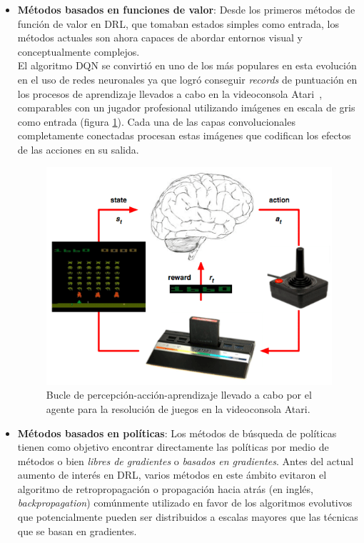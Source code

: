 \begin{itemize}
    \item \textbf{Métodos basados en funciones de valor}: Desde los primeros métodos de función de valor en DRL, que tomaban estados simples como entrada, los métodos actuales son ahora capaces de abordar entornos visual y conceptualmente complejos.\\
    
    El algoritmo DQN se convirtió en uno de los más populares en esta evolución en el uso de redes neuronales ya que logró conseguir \textit{records} de puntuación en los procesos de aprendizaje llevados a cabo en la videoconsola Atari~\cite{volodymyr_mnih_koray_kavukcuoglu}, ~\cite{volodymyr_mnih_david_silver} comparables con un jugador profesional utilizando imágenes en escala de gris como entrada (figura \ref{fig:dqn}). Cada una de las capas convolucionales completamente conectadas procesan estas imágenes que codifican los efectos de las acciones en su salida.
    
    \begin{figure}[!ht]
        \centering \includegraphics[width=0.6\columnwidth]{./figures/chapter_2/dqn_atari.png}
        \caption{
            \label{fig:dqn}
                Bucle de percepción-acción-aprendizaje llevado a cabo por el agente para la resolución de juegos en la videoconsola Atari.
        }
    \end{figure}
    
    \item \textbf{Métodos basados en políticas}: Los métodos de búsqueda de políticas tienen como objetivo encontrar directamente las políticas por medio de métodos o bien \textit{libres de gradientes} o \textit{basados en gradientes}. Antes del actual aumento de interés en DRL, varios métodos en este ámbito evitaron el algoritmo de retropropagación o propagación hacia atrás (en inglés, \textit{backpropagation}) comúnmente utilizado en favor de los algoritmos evolutivos que potencialmente pueden ser distribuidos a escalas mayores que las técnicas que se basan en gradientes.\\
    

\end{itemize}
